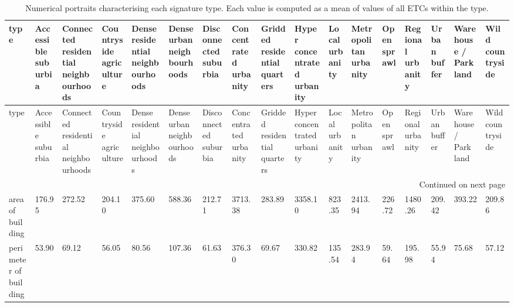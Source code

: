 \documentclass[fleqn,10pt]{wlscirep}
\begin{document}
    \begin{longtable}{p{}p{}p{}p{}p{}p{}p{}p{}p{}p{}p{}p{}p{}p{}p{}p{}p{}}
        \caption{\label{tab:port}Numerical portraits characterising each signature type. Each value is computed as a mean of values of all ETCs within the type.}\\
        \toprule
        type &  Accessible suburbia &  Connected residential neighbourhoods &  Countryside agriculture &  Dense residential neighbourhoods &  Dense urban neighbourhoods &  Disconnected suburbia &  Concentrated urbanity &  Gridded residential quarters &  Hyper concentrated urbanity &  Local urbanity &  Metropolitan urbanity &  Open sprawl &  Regional urbanity &  Urban buffer &  Warehouse / Park land &  Wild countryside \\
        \midrule
        \endfirsthead
        \toprule
        type &  Accessible suburbia &  Connected residential neighbourhoods &  Countryside agriculture &  Dense residential neighbourhoods &  Dense urban neighbourhoods &  Disconnected suburbia &  Concentrated urbanity &  Gridded residential quarters &  Hyper concentrated urbanity &  Local urbanity &  Metropolitan urbanity &  Open sprawl &  Regional urbanity &  Urban buffer &  Warehouse / Park land &  Wild countryside \\
        \midrule
        \endhead
        \midrule
        \multicolumn{17}{r}{{Continued on next page}} \\
        \midrule
        \endfoot
        \bottomrule
        \endlastfoot
        area of building                                                                                    &               176.95 &                                272.52 &                   204.10 &                            375.60 &                      588.36 &                 212.71 &                3713.38 &                        283.89 &                      3358.10 &          823.35 &                2413.94 &       226.72 &            1480.26 &        209.42 &               393.22 &            209.86 \\
        perimeter of building                                                                               &                53.90 &                                 69.12 &                    56.05 &                             80.56 &                      107.36 &                  61.63 &                 376.30 &                         69.67 &                       330.82 &          135.54 &                 283.94 &        59.64 &             195.98 &         55.94 &                75.68 &             57.12 \\

\end{longtable}
\end{document}

